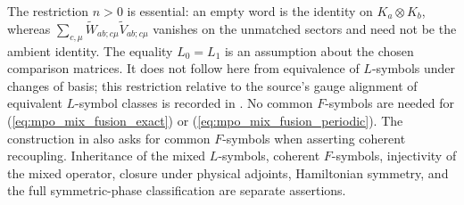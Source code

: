 The restriction $n>0$ is essential: an empty word is the identity
on $K_a\otimes K_b$, whereas
$\sum_{c,\mu}\widetilde W_{ab;c\mu}\widetilde V_{ab;c\mu}$
vanishes on the unmatched sectors and need not be the ambient identity.
The equality $L_0=L_1$ is an assumption about the chosen
comparison matrices. It does not follow here from equivalence of
$L$-symbols under changes of basis; this restriction relative to the
source's gauge alignment of equivalent $L$-symbol classes is recorded in
\cite{gap:glm23_multiplicity_l_indices}. No common $F$-symbols are needed
for (\ref{eq:mpo_mix_fusion_exact}) or
(\ref{eq:mpo_mix_fusion_periodic}). The construction in
\cite[Section~5]{GarreRubio2023MPOSym} also asks for common $F$-symbols
when asserting coherent recoupling. Inheritance of the mixed
$L$-symbols, coherent $F$-symbols, injectivity of the mixed operator,
closure under physical adjoints, Hamiltonian symmetry, and the full
symmetric-phase classification are separate assertions.
